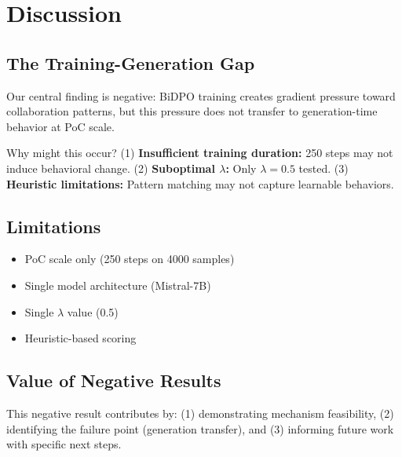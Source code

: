 \section{Discussion}

\subsection{The Training-Generation Gap}

Our central finding is negative: BiDPO training creates gradient pressure toward collaboration patterns, but this pressure does not transfer to generation-time behavior at PoC scale.

Why might this occur? (1) \textbf{Insufficient training duration:} 250 steps may not induce behavioral change. (2) \textbf{Suboptimal $\lambda$:} Only $\lambda = 0.5$ tested. (3) \textbf{Heuristic limitations:} Pattern matching may not capture learnable behaviors.

\subsection{Limitations}

\begin{itemize}
\item PoC scale only (250 steps on 4000 samples)
\item Single model architecture (Mistral-7B)
\item Single $\lambda$ value (0.5)
\item Heuristic-based scoring
\end{itemize}

\subsection{Value of Negative Results}

This negative result contributes by: (1) demonstrating mechanism feasibility, (2) identifying the failure point (generation transfer), and (3) informing future work with specific next steps.
